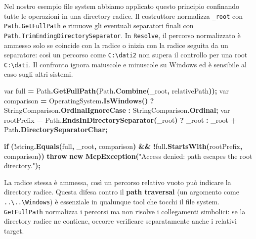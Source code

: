 \documentclass[
  italian,
  10pt,
]{book}
\newenvironment{Shaded}{\begin{snugshade}}{\end{snugshade}}
\newcommand{\DataTypeTok}[1]{\textcolor[rgb]{0.13,0.29,0.53}{#1}}
\newcommand{\FunctionTok}[1]{\textcolor[rgb]{0.13,0.29,0.53}{\textbf{#1}}}
\newcommand{\KeywordTok}[1]{\textcolor[rgb]{0.13,0.29,0.53}{\textbf{#1}}}
\newcommand{\NormalTok}[1]{#1}
\newcommand{\OperatorTok}[1]{\textcolor[rgb]{0.81,0.36,0.00}{\textbf{#1}}}
\newcommand{\StringTok}[1]{\textcolor[rgb]{0.31,0.60,0.02}{#1}}
\begin{document}
Nel nostro esempio file system abbiamo applicato questo principio
confinando tutte le operazioni in una directory radice. Il costruttore
normalizza \texttt{\_root} con \texttt{Path.GetFullPath} e rimuove gli
eventuali separatori finali con
\texttt{Path.TrimEndingDirectorySeparator}. In \texttt{Resolve}, il
percorso normalizzato è ammesso solo se coincide con la radice o inizia
con la radice seguita da un separatore: così un percorso come
\texttt{C:\textbackslash{}dati2} non supera il controllo per una root
\texttt{C:\textbackslash{}dati}. Il confronto ignora maiuscole e
minuscole su Windows ed è sensibile al caso sugli altri sistemi.

\begin{Shaded}
\begin{Highlighting}[]
\DataTypeTok{var}\NormalTok{ full }\OperatorTok{=}\NormalTok{ Path}\OperatorTok{.}\FunctionTok{GetFullPath}\OperatorTok{(}\NormalTok{Path}\OperatorTok{.}\FunctionTok{Combine}\OperatorTok{(}\NormalTok{\_root}\OperatorTok{,}\NormalTok{ relativePath}\OperatorTok{));}
\DataTypeTok{var}\NormalTok{ comparison }\OperatorTok{=}\NormalTok{ OperatingSystem}\OperatorTok{.}\FunctionTok{IsWindows}\OperatorTok{()}
    \OperatorTok{?}\NormalTok{ StringComparison}\OperatorTok{.}\FunctionTok{OrdinalIgnoreCase}
    \OperatorTok{:}\NormalTok{ StringComparison}\OperatorTok{.}\FunctionTok{Ordinal}\OperatorTok{;}
\DataTypeTok{var}\NormalTok{ rootPrefix }\OperatorTok{=}\NormalTok{ Path}\OperatorTok{.}\FunctionTok{EndsInDirectorySeparator}\OperatorTok{(}\NormalTok{\_root}\OperatorTok{)}
    \OperatorTok{?}\NormalTok{ \_root}
    \OperatorTok{:}\NormalTok{ \_root }\OperatorTok{+}\NormalTok{ Path}\OperatorTok{.}\FunctionTok{DirectorySeparatorChar}\OperatorTok{;}

\KeywordTok{if} \OperatorTok{(!}\DataTypeTok{string}\OperatorTok{.}\FunctionTok{Equals}\OperatorTok{(}\NormalTok{full}\OperatorTok{,}\NormalTok{ \_root}\OperatorTok{,}\NormalTok{ comparison}\OperatorTok{)} \OperatorTok{\&\&}
    \OperatorTok{!}\NormalTok{full}\OperatorTok{.}\FunctionTok{StartsWith}\OperatorTok{(}\NormalTok{rootPrefix}\OperatorTok{,}\NormalTok{ comparison}\OperatorTok{))}
    \KeywordTok{throw} \KeywordTok{new} \FunctionTok{McpException}\OperatorTok{(}\StringTok{"Access denied: path escapes the root directory."}\OperatorTok{);}
\end{Highlighting}
\end{Shaded}

La radice stessa è ammessa, così un percorso relativo vuoto può indicare
la directory radice. Questa difesa contro il \textbf{path traversal} (un
argomento come \texttt{..\textbackslash{}..\textbackslash{}Windows}) è
essenziale in qualunque tool che tocchi il file system.
\texttt{GetFullPath} normalizza i percorsi ma non risolve i collegamenti
simbolici: se la directory radice ne contiene, occorre verificare
separatamente anche i relativi target.
\end{document}
